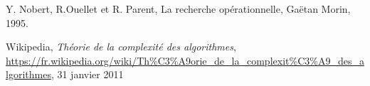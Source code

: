 \begin{thebibliography}{9}

    Y. Nobert, R.Ouellet et R. Parent,
    La recherche opérationnelle,
    Gaëtan Morin,
    1995.

    Wikipedia,
    \emph{Théorie de la complexité des algorithmes},
    \url{https://fr.wikipedia.org/wiki/Th\%C3\%A9orie_de_la_complexit\%C3\%A9_des_algorithmes},
    31 janvier 2011

\end{thebibliography}
